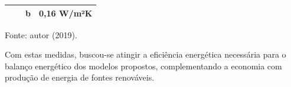 \begin{table}[H]
\begin{tabular}{llll}
                                                                                                                                &                                                                                                   & b  & 0,16 W/m²K                      \\ \hline
    \end{tabular}
    \begin{flushleft}
        \par \small Fonte: autor (2019).
    \end{flushleft}
    \label{tab:tabela13}
\end{table}
\vspace{-0.60cm} \noindent Com estas medidas, buscou-se atingir a eficiência energética necessária para o balanço energético dos modelos propostos, complementando a economia com produção de energia de fontes renováveis.
